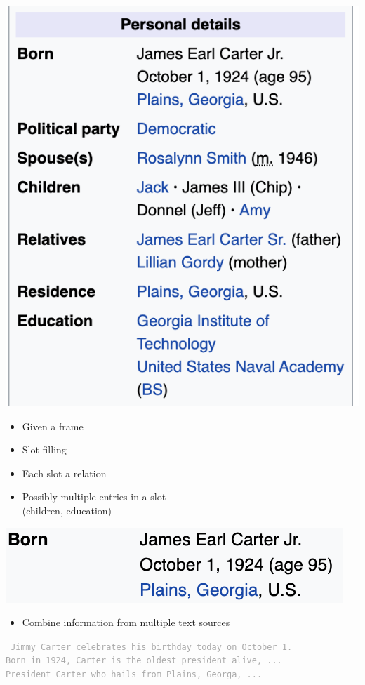 \documentclass[landscape]{jhuslides3C}
\begin{document}
\begin{flushright}
\includegraphics[scale=0.65]{jimmy-carter2.png}
\end{flushright}\vspace{-13cm}
\begin{itemize}
\item Given a frame
\item Slot filling
\item Each slot a relation
\item Possibly multiple entries in a slot\\
(children, education)
\end{itemize}


\vfill
\begin{center}
\includegraphics[scale=1.8]{jimmy-carter2a.png}
\end{center}
\vfill
\begin{itemize}
\item Combine information from multiple text sources
\end{itemize}\vspace{5mm}
\textcolor{darkgrey}{\begin{flushleft}\tt
Jimmy Carter celebrates his birthday today on October 1.\\
Born in 1924, Carter is the oldest president alive, ...\\
President Carter who hails from Plains, Georga, ...
\end{flushleft}}
\vfill
\end{document}
